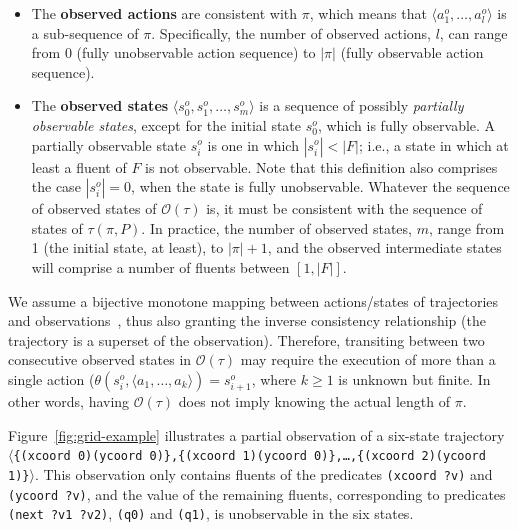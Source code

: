 \documentclass[letterpaper]{article} %
\newcommand{\tup}[1]{{\langle #1 \rangle}}
\begin{document}
\begin{itemize}
\item The {\bf observed actions} are consistent with $\pi$, which means that $\tup{a_1^o, \ldots, a_l^o}$ is a sub-sequence of $\pi$. Specifically, the number of observed actions, $l$, can range from $0$ (fully unobservable action sequence) to $|\pi|$ (fully observable action sequence).
\item The {\bf observed states} $\tup{s_0^o, s_1^o, \ldots, s_m^o}$ is a sequence of possibly {\em partially observable states}, except for the initial state $s_0^o$, which is fully observable. A partially observable state $s_i^o$ is one in which $|s_i^o| < |F|$; i.e., a state in which at least a fluent of $F$ is not observable. Note that this definition also comprises the case $|s_i^o| = 0$, when the state is fully unobservable. Whatever the sequence of observed states of $\mathcal{O}(\tau)$ is, it must be consistent with the sequence of states of $\tau(\pi,P)$. In practice, the number of observed states, $m$, range from 1 (the initial state, at least), to $|\pi|+1$, and the observed intermediate states will comprise a number of fluents between $[1,|F|]$.
\end{itemize}

We assume a bijective monotone mapping between actions/states of trajectories and observations~\cite{ramirez2009plan}, thus also granting the inverse consistency relationship (the trajectory is a superset of the observation). Therefore, transiting between two consecutive observed states in $\mathcal{O}(\tau)$ may require the execution of more than a single action ($\theta(s_i^o,\tup{a_1,\ldots,a_k})=s_{i+1}^o$, where ${k\geq 1}$ is unknown but finite. In other words, having $\mathcal{O}(\tau)$ does not imply knowing the actual length of $\pi$.

Figure~\ref{fig:grid-example} illustrates a partial observation of a six-state trajectory $\langle${\tt\small\{(xcoord 0)(ycoord 0)\},\{(xcoord 1)(ycoord 0)\},\ldots,\{(xcoord 2)(ycoord 1)\}}$\rangle$. This observation only contains fluents of the predicates {\tt\small (xcoord ?v)} and {\tt\small (ycoord ?v)}, and the value of the remaining fluents, corresponding to predicates {\tt\small (next ?v1 ?v2)}, {\tt\small (q0)} and {\tt\small (q1)}, is unobservable in the six states.
\end{document}
